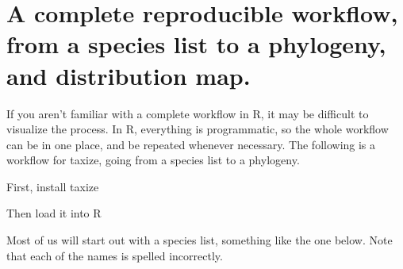 
  
\section[A complete reproducible workflow]{A complete reproducible workflow, from a species list to a phylogeny, and distribution map.} 
\label{ap:taxize:one} 

If you aren't familiar with a complete workflow in R, it may be difficult to visualize the process. In R, everything is programmatic, so the whole workflow can be in one place, and be repeated whenever necessary. The following is a workflow for taxize, going from a species list to a phylogeny. 

First, install taxize

\begin{knitrout}
\color{fgcolor}\small\begin{kframe}
\begin{alltt}
\hlstd{(}\hlstd{)}
\end{alltt}
\end{kframe}
\end{knitrout}


Then load it into R

\begin{knitrout}
\color{fgcolor}\small\begin{kframe}
\begin{alltt}
\end{alltt}
\end{kframe}
\end{knitrout}


Most of us will start out with a species list, something like the one below. Note that each of the names is spelled incorrectly.

\begin{knitrout}
\color{fgcolor}\small\begin{kframe}
\begin{alltt}
 \hlkwb{<-} \hlstd{(}\hlstd{,} \hlstd{,} 
         \hlstd{,} \hlstd{,}
         \hlstd{,} \hlstd{,} \hlstd{)}
\end{alltt}
\end{kframe}
\end{knitrout}


